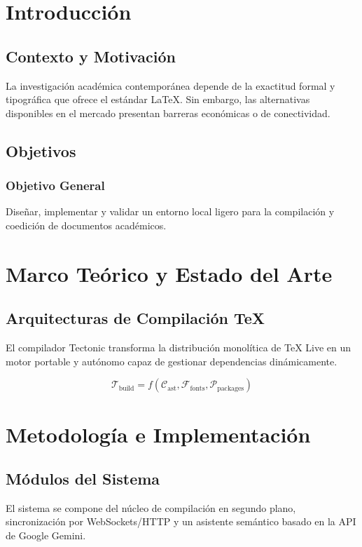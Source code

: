 \documentclass[12pt, letterpaper]{report}
\begin{document}
\chapter{Introducción}
\section{Contexto y Motivación}
La investigación académica contemporánea depende de la exactitud formal y tipográfica que ofrece el estándar LaTeX. Sin embargo, las alternativas disponibles en el mercado presentan barreras económicas o de conectividad.

\section{Objetivos}
\subsection{Objetivo General}
Diseñar, implementar y validar un entorno local ligero para la compilación y coedición de documentos académicos.

\chapter{Marco Teórico y Estado del Arte}
\section{Arquitecturas de Compilación TeX}
El compilador Tectonic transforma la distribución monolítica de TeX Live en un motor portable y autónomo capaz de gestionar dependencias dinámicamente.

\begin{equation}
  \mathcal{T}_{\text{build}} = f(\mathcal{C}_{\text{ast}}, \mathcal{F}_{\text{fonts}}, \mathcal{P}_{\text{packages}})
\end{equation}

\chapter{Metodología e Implementación}
\section{Módulos del Sistema}
El sistema se compone del núcleo de compilación en segundo plano, sincronización por WebSockets/HTTP y un asistente semántico basado en la API de Google Gemini.
\end{document}
